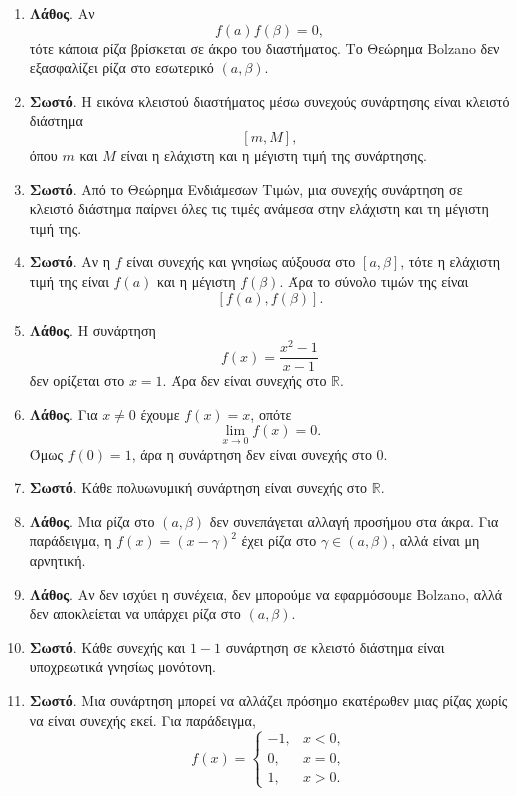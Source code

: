 \begin{enumerate}[label=\textbf{1.\arabic*.}]
\item \textbf{Λάθος}. Αν
\[
f(a)f(\beta)=0,
\]
τότε κάποια ρίζα βρίσκεται σε άκρο του διαστήματος. Το Θεώρημα Bolzano δεν εξασφαλίζει ρίζα στο εσωτερικό $(a,\beta)$.

\item \textbf{Σωστό}. Η εικόνα κλειστού διαστήματος μέσω συνεχούς συνάρτησης είναι κλειστό διάστημα
\[
[m,M],
\]
όπου $m$ και $M$ είναι η ελάχιστη και η μέγιστη τιμή της συνάρτησης.

\item \textbf{Σωστό}. Από το Θεώρημα Ενδιάμεσων Τιμών, μια συνεχής συνάρτηση σε κλειστό διάστημα παίρνει όλες τις τιμές ανάμεσα στην ελάχιστη και τη μέγιστη τιμή της.

\item \textbf{Σωστό}. Αν η $f$ είναι συνεχής και γνησίως αύξουσα στο $[a,\beta]$, τότε η ελάχιστη τιμή της είναι $f(a)$ και η μέγιστη $f(\beta)$. Άρα το σύνολο τιμών της είναι
\[
[f(a),f(\beta)].
\]

\item \textbf{Λάθος}. Η συνάρτηση
\[
f(x)=\frac{x^2-1}{x-1}
\]
δεν ορίζεται στο $x=1$. Άρα δεν είναι συνεχής στο $\mathbb{R}$.

\item \textbf{Λάθος}. Για $x\neq0$ έχουμε $f(x)=x$, οπότε
\[
\lim_{x\to0}f(x)=0.
\]
Όμως $f(0)=1$, άρα η συνάρτηση δεν είναι συνεχής στο $0$.

\item \textbf{Σωστό}. Κάθε πολυωνυμική συνάρτηση είναι συνεχής στο $\mathbb{R}$.

\item \textbf{Λάθος}. Μια ρίζα στο $(a,\beta)$ δεν συνεπάγεται αλλαγή προσήμου στα άκρα. Για παράδειγμα, η $f(x)=(x-\gamma)^2$ έχει ρίζα στο $\gamma\in(a,\beta)$, αλλά είναι μη αρνητική.

\item \textbf{Λάθος}. Αν δεν ισχύει η συνέχεια, δεν μπορούμε να εφαρμόσουμε Bolzano, αλλά δεν αποκλείεται να υπάρχει ρίζα στο $(a,\beta)$.

\item \textbf{Σωστό}. Κάθε συνεχής και $1-1$ συνάρτηση σε κλειστό διάστημα είναι υποχρεωτικά γνησίως μονότονη.

\item \textbf{Σωστό}. Μια συνάρτηση μπορεί να αλλάζει πρόσημο εκατέρωθεν μιας ρίζας χωρίς να είναι συνεχής εκεί. Για παράδειγμα,
\[
f(x)=
\begin{cases}
-1,&x<0,\\
0,&x=0,\\
1,&x>0.
\end{cases}
\]


\end{enumerate}
